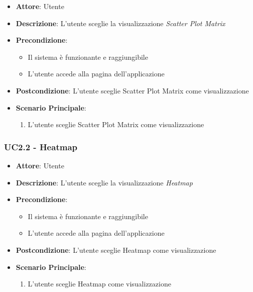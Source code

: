     \begin{itemize}
    \item \textbf{Attore}: Utente
    \item \textbf{Descrizione}: L'utente sceglie la visualizzazione \emph{Scatter Plot Matrix}
    \item \textbf{Precondizione}:
    \begin{itemize}
        \item Il sistema è funzionante e raggiungibile
        \item L'utente accede alla pagina dell'applicazione
    \end{itemize}
    \item \textbf{Postcondizione}: L'utente sceglie Scatter Plot Matrix come visualizzazione
    \item \textbf{Scenario Principale}: 
        \begin{enumerate}
            \item L'utente sceglie Scatter Plot Matrix come visualizzazione
        \end{enumerate}
    \end{itemize}
    
    \subsubsection{UC2.2 - Heatmap}
    \label{uc2.2}
    
    \begin{itemize}
    \item \textbf{Attore}: Utente
    \item \textbf{Descrizione}: L'utente sceglie la visualizzazione \emph{Heatmap}
    \item \textbf{Precondizione}:
    \begin{itemize}
        \item Il sistema è funzionante e raggiungibile
        \item L'utente accede alla pagina dell'applicazione
    \end{itemize}
    \item \textbf{Postcondizione}: L'utente sceglie Heatmap come visualizzazione
    \item \textbf{Scenario Principale}: 
        \begin{enumerate}
            \item L'utente sceglie Heatmap come visualizzazione
        \end{enumerate}
    \end{itemize}
    
